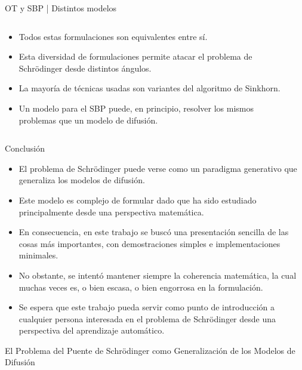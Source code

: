 \documentclass[aspectratio=43, 10pt]{beamer} %
\begin{document}
\begin{frame}{OT y SBP | Distintos modelos}
    \begin{columns}
        \begin{column}{0.7\textwidth}
            \begin{itemize}
                \item<1> Todos estas formulaciones son equivalentes entre sí.
                \item<2> Esta diversidad de formulaciones permite atacar el problema de Schrödinger desde distintos ángulos.
                \item<3> La mayoría de técnicas usadas son variantes del algoritmo de Sinkhorn.
                \item<4> Un modelo para el SBP puede, en principio, resolver los mismos problemas que un modelo de difusión.
            \end{itemize}
        \end{column}
        \begin{column}{0.29\textwidth}
        \end{column}
    \end{columns}
\end{frame}

\begin{frame}{Conclusión}
    \begin{itemize}
        \item<1> El problema de Schrödinger puede verse como un paradigma generativo que generaliza los modelos de difusión.
        \item<2> Este modelo es complejo de formular dado que ha sido estudiado principalmente desde una perspectiva matemática.
        \item<3> En consecuencia, en este trabajo se buscó una presentación sencilla de las cosas más importantes, con demostraciones simples e implementaciones minimales.
        \item<4> No obstante, se intentó mantener siempre la coherencia matemática, la cual muchas veces es, o bien escasa, o bien engorrosa en la formulación.
        \item<5> Se espera que este trabajo pueda servir como punto de introducción a cualquier persona interesada en el problema de Schrödinger desde una perspectiva del aprendizaje automático.
    \end{itemize}
\end{frame}

\begin{frame}
    \centering
    \Large{El Problema del Puente de Schrödinger como Generalización de los Modelos de Difusión}
\end{frame}
\end{document}
